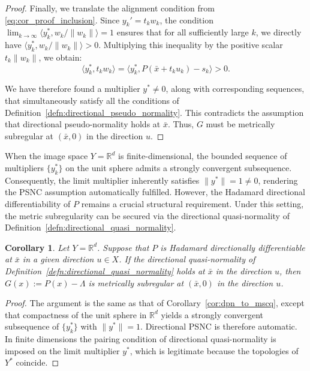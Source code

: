 \documentclass[12pt,twoside,reqno]{amsart}
\newtheorem{corollary}[theorem]{Corollary}
\theoremstyle{definition}
\numberwithin{equation}{section}
\begin{document}
\begin{proof}
    Finally, we translate the alignment condition from \eqref{eq:cor_proof_inclusion}. Since $y_k' = t_k w_k$, the condition $\lim_{k \to \infty} \langle y_k^*, w_k/\|w_k\| \rangle = 1$ ensures that for all sufficiently large $k$, we directly have $\langle y_k^*, w_k/\|w_k\| \rangle > 0$. Multiplying this inequality by the positive scalar $t_k \|w_k\|$, we obtain:
    \begin{equation*}
        \langle y_k^*, t_k w_k \rangle = \langle y_k^*, P(\bar{x} + t_k u_k) - s_k \rangle > 0.
    \end{equation*}

    We have therefore found a multiplier $y^* \neq 0$, along with corresponding sequences, that simultaneously satisfy all the conditions of Definition~\ref{defn:directional_pseudo_normality}. This contradicts the assumption that directional pseudo-normality holds at $\bar{x}$. Thus, $G$ must be metrically subregular at $(\bar{x}, 0)$ in the direction $u$.  
\end{proof}

When the image space $Y = \mathbb{R}^d$ is finite-dimensional, the bounded sequence of multipliers $\{y_k^*\}$ on the unit sphere admits a strongly convergent subsequence. Consequently, the limit multiplier inherently satisfies $\|y^*\| = 1 \neq 0$, rendering the PSNC assumption automatically fulfilled. However, the Hadamard directional differentiability of $P$ remains a crucial structural requirement. Under this setting, the metric subregularity can be secured via the directional quasi-normality of Definition~\ref{defn:directional_quasi_normality}.

\begin{corollary} \label{cor:dqn_to_mscq}
    Let $Y = \mathbb{R}^d$. Suppose that $P$ is Hadamard directionally differentiable at $\bar{x}$ in a given direction $u \in X$. If the directional quasi-normality of Definition~\ref{defn:directional_quasi_normality} holds at $\bar{x}$ in the direction $u$, then $G(x) := P(x) - \Lambda$ is metrically subregular at $(\bar{x}, 0)$ in the direction $u$. 
\end{corollary}

\begin{proof}
The argument is the same as that of Corollary~\ref{cor:dpn_to_mscq}, except that compactness of the unit sphere in $\mathbb{R}^d$ yields a strongly convergent subsequence of $\{y_k^*\}$ with $\|y^*\|=1$. Directional PSNC is therefore automatic. In finite dimensions the pairing condition of directional quasi-normality is imposed on the limit multiplier $y^*$, which is legitimate because the topologies of $Y^*$ coincide.  
\end{proof}
\end{document}
